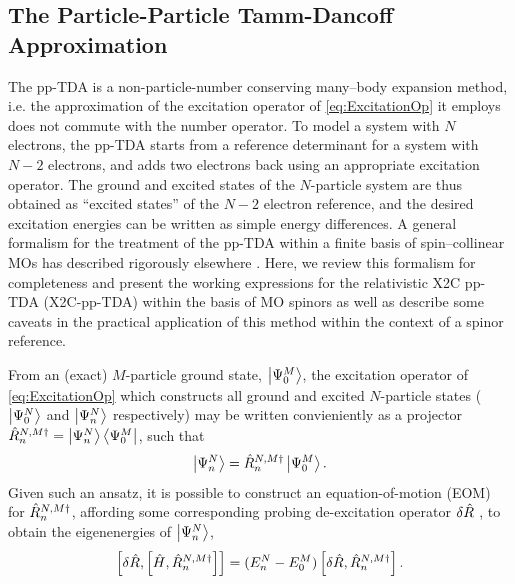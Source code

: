 \subsection{The Particle-Particle Tamm-Dancoff Approximation}
\label{subsec:ppTDA}
The pp-TDA is a non-particle-number conserving many--body expansion method, i.e. the
approximation of the excitation operator of \cref{eq:ExcitationOp} it employs does not commute with the number
operator.  To model a system with $N$ electrons, the pp-TDA starts from a
reference determinant for a system with $N-2$  electrons, and adds two
electrons back using an appropriate excitation operator.  The ground and
excited states of the $N$-particle system are thus obtained as ``excited
states'' of the $N-2$ electron reference, and the desired excitation energies
can be written as simple energy differences.  A general formalism for the
treatment of the pp-TDA within a finite basis of spin--collinear MOs has
described rigorously elsewhere
\cite{Yang13_224105,Yang13_18A522,Yang13_104112}.  Here, we review this
formalism for completeness and present the working expressions for the
relativistic X2C pp-TDA (X2C-pp-TDA) within the basis of MO spinors as well as
describe some caveats in the practical application of this method within the
context of a spinor reference.

From an (exact) $M$-particle ground state, $\left\vert \Psi_0^M \right\rangle$, the excitation operator
of \cref{eq:ExcitationOp} which constructs all ground and excited 
$N$-particle states ($\left\vert \Psi_0^N \right\rangle$ and $\left\vert \Psi_n^N \right\rangle$ respectively) may be written
convieniently as a projector $\hat{R}^{N,M\dagger}_n = \left\vert \Psi_n^N \right\rangle\left\langle \Psi_0^M \right\vert$, such that
\begin{equation}
  \left\vert \Psi_n^N \right\rangle = \hat{R}^{N,M\dagger}_n \left\vert \Psi_0^M \right\rangle.
\end{equation}
Given such an ansatz, it is possible to construct an equation-of-motion (EOM) \cite{SchuckBook_04} 
for $\hat{R}_n^{N,M\dagger}$, affording some corresponding
probing de-excitation operator $\delta \hat{R}$ , to obtain the eigenenergies of $\left\vert \Psi_n^N \right\rangle$,
\begin{equation}
\label{eq:EOM}
  \left[ \delta \hat{R},\left[ \hat{H}, \hat{R}_n^{N,M\dagger} \right]\right] = 
    (E^N_n - E^M_0)\left[\delta \hat{R}, \hat{R}^{N,M\dagger}_n \right].
\end{equation}

